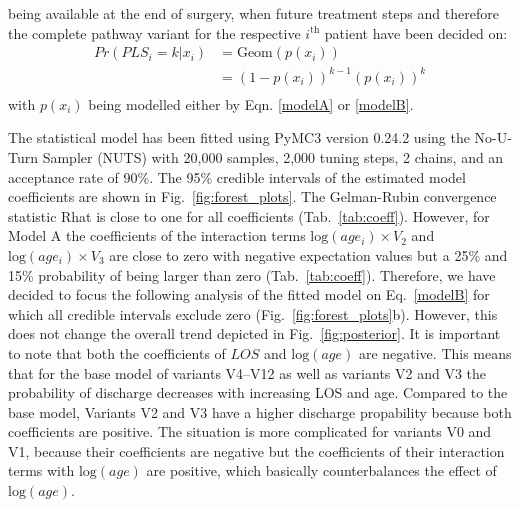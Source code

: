  being available at the end of surgery, when future treatment steps and therefore the complete pathway variant for the respective $i^\text{th}$ patient have been decided on:
\begin{equation}
\begin{split}
Pr(PLS_i=k|x_i) & = \text{Geom}\left(p(x_i)\right) \\
& = \left(1-p(x_i)\right)^{k-1}\left(p(x_i)\right)^{k} \\
\end{split}
\end{equation}
with $p(x_i)$ being modelled either by Eqn. \eqref{modelA} or
\eqref{modelB}.
    
The statistical model has been fitted using PyMC3
\citep{Salvatier2016_PyMC3} version 0.24.2 using the No-U-Turn Sampler
(NUTS) with 20,000 samples, 2,000 tuning steps, 2 chains, and an
acceptance rate of 90\%. The 95\% credible intervals of the estimated
model coefficients are shown in Fig.~\ref{fig:forest_plots}. The
Gelman-Rubin convergence statistic Rhat is close to one for all
coefficients (Tab.~\ref{tab:coeff}). 
However, for Model A the coefficients of the interaction terms
$\text{log}(age_i)\times V_2$ and $\text{log}(age_i)\times V_3$ are
close to zero with negative expectation values but a 25\% and 15\%
probability of being larger than zero (Tab.~\ref{tab:coeff}). 
Therefore, we have decided to focus the following analysis of the
fitted model on Eq.~\ref{modelB} for which all credible intervals
exclude zero (Fig.~\ref{fig:forest_plots}b).
However, this does not change the overall trend depicted in Fig.~\ref{fig:posterior}.
It is important to note that both the coefficients of $LOS$ and $\text{log}(age)$ are negative. This means that for the base model of variants V4--V12 as well as variants V2 and V3 the probability of discharge decreases with increasing LOS and age. 
Compared to the base model, Variants V2 and V3 have a higher discharge propability because both coefficients are positive. 
The situation is more complicated for variants V0 and V1, because their coefficients are negative but the coefficients of their interaction terms with $\text{log}(age)$ are positive, which basically counterbalances the effect of $\text{log}(age)$.

